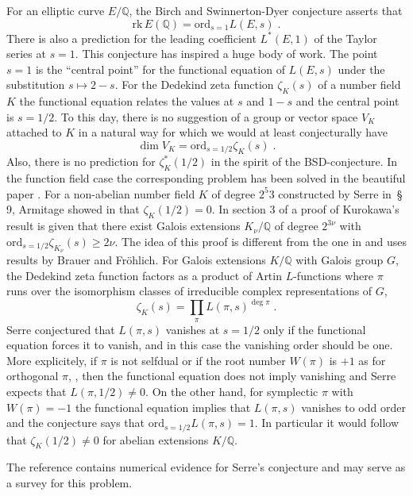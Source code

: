 \documentclass[12pt,leqno]{article}
\newcommand{\Q}{{\mathbb{Q}}}
\newcommand{\ord}{\mathrm{ord}}
\newcommand{\rk}{\mathrm{rk}\,}
\begin{document}
For an elliptic curve $E / \Q$, the Birch and Swinnerton-Dyer conjecture asserts that
\[
\rk E (\Q) = \ord_{s = 1} L (E , s) \; .
\]
There is also a prediction for the leading coefficient $L^* (E ,1)$ of the Taylor series at $s = 1$. This conjecture has inspired a huge body of work. The point $s = 1$ is the ``central point'' for the functional equation of $L (E,s)$ under the substitution $s \mapsto 2-s$. For the Dedekind zeta function $\zeta_K (s)$ of a number field $K$ the functional equation relates the values at $s$ and $1-s$ and the central point is $s = 1/2$. To this day, there is no suggestion of a group or vector space $V_K$ attached to $K$ in a natural way for which we would at least conjecturally have
\begin{equation}
\label{eq:1n}
\dim V_K = \ord_{s = 1/2} \zeta_K (s) \; .
\end{equation}
Also, there is no prediction for $\zeta^*_K (1/2)$ in the spirit of the BSD-conjecture. In the function field case the corresponding problem has been solved in the beautiful paper \cite{R}. For a non-abelian number field $K$ of degree $2^5 3$ constructed by Serre in \cite{Se}\,\S\,9, Armitage showed in \cite{A} that $\zeta_K (1/2) = 0$. In section 3 of \cite{M} a proof of Kurokawa's result is given that there exist Galois extensions $K_{\nu} / \Q$ of degree $2^{3 \nu}$ with $\ord_{s = 1/2} \zeta_{K_{\nu}} (s) \ge 2 \nu$. The idea of this proof is different from the one in \cite{A} and uses results by Brauer and Fr\"ohlich. For Galois extensions $K / \Q$ with Galois group $G$, the Dedekind zeta function factors as a product of Artin $L$-functions where $\pi$ runs over the isomorphism classes of irreducible complex representations of $G$,
\[
\zeta_K (s) = \prod_{\pi} L (\pi , s)^{\deg \pi} \; .
\]
Serre conjectured that $L (\pi , s)$ vanishes at $s = 1/2$ only if the functional equation forces it to vanish, and in this case the vanishing order should be one. More explicitely, if $\pi$ is not selfdual or if the root number $W (\pi)$ is $+1$ as for orthogonal $\pi$, \cite{FQ}, then the functional equation does not imply vanishing and Serre expects that $L (\pi , 1/2) \neq 0$. On the other hand, for symplectic $\pi$ with $W (\pi) = -1$ the functional equation implies that $L (\pi , s)$ vanishes to odd order and the conjecture says that $\ord_{s = 1/2} L (\pi , s) = 1$. In particular it would follow that $\zeta_K (1/2) \neq 0$ for abelian extensions $K / \Q$. 

 The reference \cite{O} contains numerical evidence for Serre's conjecture and may serve as a survey for this problem. 
\end{document}
